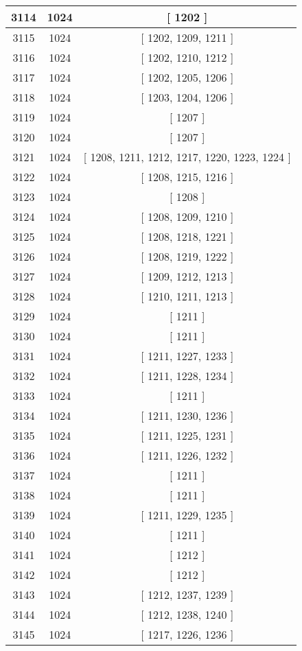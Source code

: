 \begin{center}
\begin{longtable}[H]{|| c c c ||}
\hline
3114 & 1024 & [ 1202 ] \\ 
\hline
3115 & 1024 & [ 1202, 1209, 1211 ] \\ 
\hline
3116 & 1024 & [ 1202, 1210, 1212 ] \\ 
\hline
3117 & 1024 & [ 1202, 1205, 1206 ] \\ 
\hline
3118 & 1024 & [ 1203, 1204, 1206 ] \\ 
\hline
3119 & 1024 & [ 1207 ] \\ 
\hline
3120 & 1024 & [ 1207 ] \\ 
\hline
3121 & 1024 & [ 1208, 1211, 1212, 1217, 1220, 1223, 1224 ] \\ 
\hline
3122 & 1024 & [ 1208, 1215, 1216 ] \\ 
\hline
3123 & 1024 & [ 1208 ] \\ 
\hline
3124 & 1024 & [ 1208, 1209, 1210 ] \\ 
\hline
3125 & 1024 & [ 1208, 1218, 1221 ] \\ 
\hline
3126 & 1024 & [ 1208, 1219, 1222 ] \\ 
\hline
3127 & 1024 & [ 1209, 1212, 1213 ] \\ 
\hline
3128 & 1024 & [ 1210, 1211, 1213 ] \\ 
\hline
3129 & 1024 & [ 1211 ] \\ 
\hline
3130 & 1024 & [ 1211 ] \\ 
\hline
3131 & 1024 & [ 1211, 1227, 1233 ] \\ 
\hline
3132 & 1024 & [ 1211, 1228, 1234 ] \\ 
\hline
3133 & 1024 & [ 1211 ] \\ 
\hline
3134 & 1024 & [ 1211, 1230, 1236 ] \\ 
\hline
3135 & 1024 & [ 1211, 1225, 1231 ] \\ 
\hline
3136 & 1024 & [ 1211, 1226, 1232 ] \\ 
\hline
3137 & 1024 & [ 1211 ] \\ 
\hline
3138 & 1024 & [ 1211 ] \\ 
\hline
3139 & 1024 & [ 1211, 1229, 1235 ] \\ 
\hline
3140 & 1024 & [ 1211 ] \\ 
\hline
3141 & 1024 & [ 1212 ] \\ 
\hline
3142 & 1024 & [ 1212 ] \\ 
\hline
3143 & 1024 & [ 1212, 1237, 1239 ] \\ 
\hline
3144 & 1024 & [ 1212, 1238, 1240 ] \\ 
\hline
3145 & 1024 & [ 1217, 1226, 1236 ] \\ 

\end{longtable}
\end{center}
